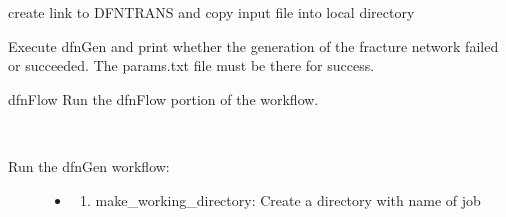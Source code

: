 \documentclass[letterpaper,10pt,english]{sphinxmanual}
\begin{document}
\begin{fulllineitems}
\begin{fulllineitems}
\begin{description}
\begin{itemize}
\end{itemize}

\end{description}

\end{fulllineitems}


\begin{fulllineitems}
\label{pydfnworks:pydfnworks.DFNWORKS.copy_dfn_trans_files}
create link to DFNTRANS and copy input file into local directory

\end{fulllineitems}


\begin{fulllineitems}
\label{pydfnworks:pydfnworks.DFNWORKS.create_network}
Execute dfnGen and print whether the generation of the fracture network failed or succeeded. The params.txt file must be there for success.

\end{fulllineitems}


\begin{fulllineitems}
\label{pydfnworks:pydfnworks.DFNWORKS.dfn_flow}
dfnFlow
Run the dfnFlow portion of the workflow.

\end{fulllineitems}


\begin{fulllineitems}
\label{pydfnworks:pydfnworks.DFNWORKS.dfn_gen}~\begin{description}
\item[{Run the dfnGen workflow: }] \leavevmode\begin{itemize}
\item {} \begin{enumerate}
\item {} 
make\_working\_directory: Create a directory with name of job

\end{enumerate}


\end{itemize}
\end{description}
\end{fulllineitems}
\end{fulllineitems}
\end{document}
